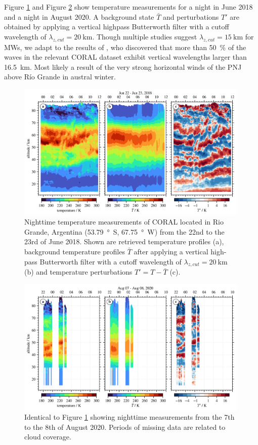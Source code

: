Figure \ref{fig:coral_2018} and Figure \ref{fig:coral_2020} show temperature measurements for a night in June 2018 and a night in August 2020. A background state $\bar{T}$ and perturbations $T'$ are obtained by applying a vertical highpass Butterworth filter with a cutoff wavelength of $\lambda_{z,cut}=\SI{20}{\kilo\meter}$. Though multiple studies suggest $\lambda_{z,cut}=\SI{15}{\kilo\meter}$ for MWs, we adapt to the results of \textcite[]{reichert_robert_characterization_2022}, who discovered that more than \SI{50}{\percent} of the waves in the relevant CORAL dataset exhibit vertical wavelengths larger than \SI{16.5}{\kilo\meter}. Most likely a result of the very strong horizontal winds of the PNJ above Río Grande in austral winter.
\begin{figure}[tbp]
    \centering
    \includegraphics[width=0.99\textwidth]{figures_lidar/coral_event_20180622.png}
    \caption{Nighttime temperature measurements of CORAL located in Rio Grande, Argentina (\SI{53.79}{\degree S}, \SI{67.75}{\degree W}) from the 22nd to the 23rd of June 2018. Shown are retrieved temperature profiles (a), background temperature profiles $\bar{T}$ after applying a vertical high-pass Butterworth filter with a cutoff wavelength of $\lambda_{z,cut}=\SI{20}{\kilo\meter}$ (b) and temperature perturbations $T'=T-\bar{T}$ (c).}
    \label{fig:coral_2018}
\end{figure}
\begin{figure}[tbp]
    \centering
    \includegraphics[width=0.99\textwidth]{figures_lidar/coral_event_20200807.png}
    \caption{Identical to Figure \ref{fig:coral_2018} showing nighttime measurements from the 7th to the 8th of August 2020. Periods of missing data are related to cloud coverage.}
    \label{fig:coral_2020}
\end{figure}
